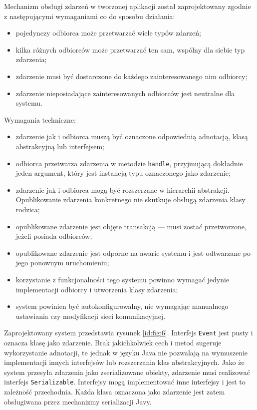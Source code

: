 \documentclass[a4paper]{book}
\begin{document}
{Mechanizm obsługi zdarzeń w tworzonej aplikacji został zaprojektowany zgodnie z następującymi wymaganiami co do sposobu działania:%
\begin{itemize}
	\item pojedynczy odbiorca może przetwarzać wiele typów zdarzeń;
	\item kilka różnych odbiorców może przetwarzać ten sam, wspólny dla siebie typ zdarzenia;
	\item zdarzenie musi być dostarczone do każdego zainteresowanego nim odbiorcy;
	\item zdarzenie nieposiadające zainteresowanych odbiorców jest neutralne dla systemu.
\end{itemize}
Wymagania techniczne:
\begin{itemize}
	\item zdarzenie jak i odbiorca muszą być oznaczone odpowiednią adnotacją, klasą abstrakcyjną lub interfejsem;
	\item odbiorca przetwarza zdarzenia w metodzie \lstinline|handle|, przyjmującą dokładnie jeden argument, który jest instancją typu oznaczonego jako zdarzenie;
	\item zdarzenie jak i odbiorca mogą być rozszerzane w hierarchii abstrakcji. Opublikowanie zdarzenia konkretnego nie skutkuje obsługą zdarzenia klasy rodzica;
	\item opublikowane zdarzenie jest objęte transakcją --- musi zostać przetworzone, jeżeli posiada odbiorców;
	\item opublikowane zdarzenie jest odporne na awarie systemu i jest odtwarzane po jego ponownym uruchomieniu;
	\item korzystanie z funkcjonalności tego systemu powinno wymagać jedynie implementacji odbiorcy i utworzenia klasy zdarzenia;
	\item system powinien być autokonfigurowalny, nie wymagając manualnego ustawiania czy modyfikacji sieci komunikacyjnej.
\end{itemize}

Zaprojektowany system przedstawia rysunek \ref{id:fig:6}. Interfejs \lstinline|Event| jest pusty i oznacza klasę jako zdarzenie. Brak jakichkolwiek cech i metod sugeruje wykorzystanie adnotacji, te jednak w języku Java nie pozwalają na wymuszenie implementacji innych interfejsów lub rozszerzania klas abstrakcyjnych. Jako że system przesyła zdarzenia jako zserializowane obiekty, zdarzenie musi realizować interfejs \lstinline|Serializable|. Interfejsy mogą implementować inne interfejsy i jest to zależność przechodnia. Każda klasa oznaczona jako zdarzenie jest zatem obsługiwana przez mechanizmy serializacji Javy.

}
\end{document}
